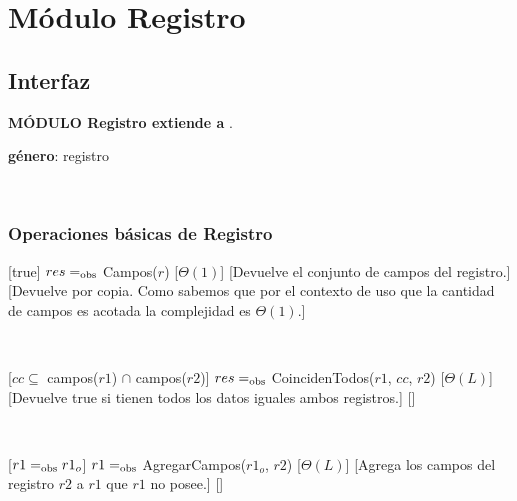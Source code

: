 \section{Módulo Registro}

\subsection{Interfaz}

\textbf{MÓDULO Registro extiende a} .

\textbf{género}: registro


~


\subsubsection{Operaciones básicas de Registro}

\begin{Interfaz}

[true]
{$res =_{\mathrm{obs}}$ Campos($r$)}
[$\Theta(1)$]
[Devuelve el conjunto de campos del registro.]
[Devuelve por copia. Como sabemos que por el contexto de uso que la cantidad de campos es acotada la complejidad es $\Theta(1)$.]



~

[$cc \subseteq$ campos($r1$) $\cap$ campos($r2$)]
{$res =_{\mathrm{obs}}$ CoincidenTodos($r1$, $cc$, $r2$)}
[$\Theta(L)$]
[Devuelve true si tienen todos los datos iguales ambos registros.]
[]



~

[$r1 =_{\mathrm{obs}} r1_o$]
{$r1 =_{\mathrm{obs}}$ AgregarCampos($r1_o$, $r2$)}
[$\Theta(L)$]
[Agrega los campos del registro $r2$ a $r1$ que $r1$ no posee.]
[]


\end{Interfaz}

